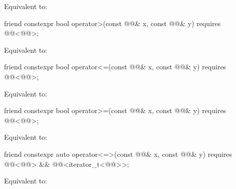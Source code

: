\begin{itemdescr}
\pnum
\effects
Equivalent to: 
\end{itemdescr}

%
\begin{itemdecl}
friend constexpr bool operator>(const @@& x, const @@& y)
  requires @@<@@>;
\end{itemdecl}

\begin{itemdescr}
\pnum
\effects
Equivalent to: 
\end{itemdescr}

%
\begin{itemdecl}
friend constexpr bool operator<=(const @@& x, const @@& y)
  requires @@<@@>;
\end{itemdecl}

\begin{itemdescr}
\pnum
\effects
Equivalent to: 
\end{itemdescr}

%
\begin{itemdecl}
friend constexpr bool operator>=(const @@& x, const @@& y)
  requires @@<@@>;
\end{itemdecl}

\begin{itemdescr}
\pnum
\effects
Equivalent to: 
\end{itemdescr}

%
\begin{itemdecl}
friend constexpr auto operator<=>(const @@& x, const @@& y)
  requires @@<@@> && @@<iterator_t<@@>>;
\end{itemdecl}

\begin{itemdescr}
\pnum
\effects
Equivalent to: 
\end{itemdescr}

